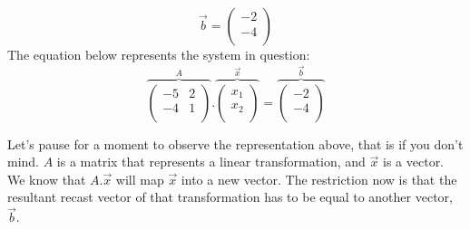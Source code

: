 \documentclass[a4,12pt,twosided,openany]{memoir}
\begin{document}
\[\overrightarrow{b} =  \begin{pmatrix}
-2 \\
-4 \\
\end{pmatrix}\] 
The equation below represents the system in question:
\[ \overbrace{ \begin{pmatrix}
-5 & 2  \\
-4 & 1 \\
\end{pmatrix}}^A.\overbrace{\begin{pmatrix}
x_1 \\
x_2  \\
\end{pmatrix}}^{ \overrightarrow{x}} = \overbrace{\begin{pmatrix}
-2\\
-4 \\
\end{pmatrix}}^{\overrightarrow{b}} \]
\par 
\indent
Let’s pause for a moment to observe the representation above, that is if you don’t mind. $A$ is a matrix that represents a linear transformation, and $\overrightarrow{x}$ is a vector. We know that $A.\overrightarrow{x}$ will map $\overrightarrow{x}$ into a new vector. The restriction now is that the resultant recast vector of that transformation has to be equal to another vector, $\overrightarrow{b}$.
\end{document}
